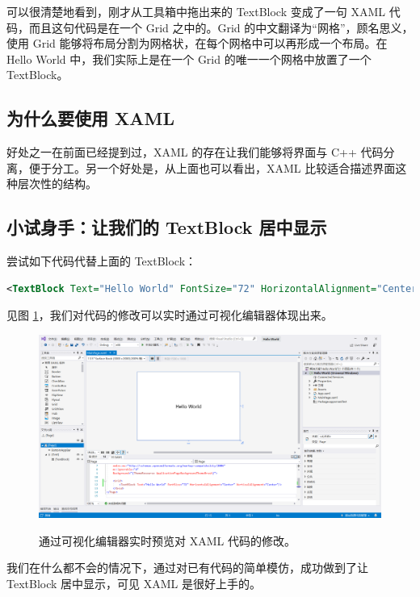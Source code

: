 可以很清楚地看到，刚才从工具箱中拖出来的 TextBlock 变成了一句 XAML 代码，而且这句代码是在一个 Grid 之中的。Grid 的中文翻译为``网格''，顾名思义，使用 Grid 能够将布局分割为网格状，在每个网格中可以再形成一个布局。在 Hello World 中，我们实际上是在一个 Grid 的唯一一个网格中放置了一个 TextBlock。

\subsection{为什么要使用 XAML}

好处之一在前面已经提到过，XAML 的存在让我们能够将界面与 C++ 代码分离，便于分工。另一个好处是，从上面也可以看出，XAML 比较适合描述界面这种层次性的结构。

\subsection{小试身手：让我们的 TextBlock 居中显示}

尝试如下代码代替上面的 TextBlock：
\begin{lstlisting}[language = xml]
    <TextBlock Text="Hello World" FontSize="72" HorizontalAlignment="Center" VerticalAlignment="Center"/>
\end{lstlisting}

见图 \ref{pic14}，我们对代码的修改可以实时通过可视化编辑器体现出来。
\begin{figure}[htbp]
    \centering
    \includegraphics[width = 0.75\paperwidth]{pic/14.png}
    \label{pic14}
    \caption{通过可视化编辑器实时预览对 XAML 代码的修改。}
\end{figure}

我们在什么都不会的情况下，通过对已有代码的简单模仿，成功做到了让 TextBlock 居中显示，可见 XAML 是很好上手的。